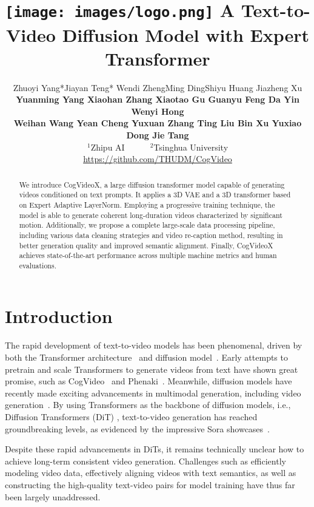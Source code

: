\documentclass{article} \usepackage{iclr2024_conference,times}
\title{
\texttt{[image: images/logo.png]}
A Text-to-Video Diffusion Model with Expert Transformer}
\author{Zhuoyi Yang*\aspace Jiayan Teng* \aspace Wendi Zheng\aspace Ming Ding\aspace Shiyu Huang \aspace Jiazheng Xu \aspace \\
\textbf{Yuanming Yang \aspace Xiaohan Zhang \aspace Xiaotao Gu 
\aspace Guanyu Feng \aspace  Da Yin \aspace Wenyi Hong \aspace } \\
\textbf{ Weihan Wang \aspace Yean Cheng \aspace Yuxuan Zhang \aspace Ting Liu \aspace Bin Xu \aspace Yuxiao Dong \aspace Jie Tang} \\
$^1$Zhipu AI\ \ \ \ \ \ $^2$Tsinghua University \\
\href{https://github.com/THUDM/CogVideo}{https://github.com/THUDM/CogVideo}
}
\begin{document}
\maketitle

\renewcommand{\thefootnote}{}
\renewcommand{\thefootnote}{\arabic{footnote}}
\begin{abstract}
We introduce CogVideoX, a large diffusion transformer model capable of generating videos conditioned on text prompts. It applies a 3D VAE and a 3D transformer based on Expert Adaptive LayerNorm. Employing a progressive training technique, the model is able to generate coherent long-duration videos characterized by significant motion. Additionally, we propose a complete large-scale data processing pipeline, including various data cleaning strategies and video re-caption method, resulting in better generation quality and improved semantic alignment. Finally, CogVideoX achieves state-of-the-art performance across multiple machine metrics and human evaluations.
\end{abstract}

\section{Introduction}

The rapid development of text-to-video models has been phenomenal, driven by both the Transformer architecture~\cite{vaswani2017attention} and diffusion model~\cite{ho2020denoising}. 
Early attempts to pretrain and scale Transformers to generate videos from text have shown great promise, such as CogVideo~\cite{hong2022cogvideo} and Phenaki~\cite{villegas2022phenaki}. 
Meanwhile, diffusion models have recently made exciting advancements in multimodal generation, including video generation~\cite{singer2022make, ho2022imagen}. 
By using Transformers as the backbone of diffusion models, i.e., Diffusion Transformers (DiT) \cite{peebles2023scalable}, text-to-video generation has reached groundbreaking levels, as evidenced by the impressive Sora showcases~\cite{sora}.  


Despite these rapid advancements in DiTs, it remains technically unclear how to achieve long-term consistent video generation. 
Challenges such as efficiently modeling video data, effectively aligning videos with text semantics, as well as constructing the high-quality text-video pairs for model training have thus far been largely unaddressed. 
\end{document}
